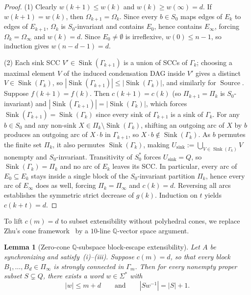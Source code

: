 \documentclass[11pt,a4paper]{article}
\newtheorem{lemma}[theorem]{Lemma}
\theoremstyle{definition}
\theoremstyle{remark}
\newcommand{\Sink}{\operatorname{Sink}}
\newcommand{\Source}{\operatorname{Source}}
\begin{document}
\begin{proof}
(1) Clearly $w(k + 1) \le w(k)$ and $w(k) \ge w(\infty) = d$. If $w(k + 1) = w(k)$, then $\Omega_{k+1} = \Omega_k$. Since every $b \in S_0$ maps edges of $E_k$ to edges of $E_{k+1}$, $\Omega_k$ is $S_0$-invariant and contains $E_0$, hence contains $E_\infty$, forcing $\Omega_k = \Omega_\infty$ and $w(k) = d$. Since $E_0 \neq \emptyset$ is irreflexive, $w(0) \le n - 1$, so induction gives $w(n - d - 1) = d$.

(2) Each sink SCC $V' \in \Sink(\Gamma_{k+1})$ is a union of SCCs of $\Gamma_k$; choosing a maximal element $V$ of the induced condensation DAG inside $V'$ gives a distinct $V \in \Sink(\Gamma_k)$, so $|\Sink(\Gamma_{k+1})| \le |\Sink(\Gamma_k)|$, and similarly for $\Source$. Suppose $f(k + 1) = f(k)$. Then $c(k + 1) = c(k)$ (so $\Pi_{k+1} = \Pi_k$ is $S_0$-invariant) and $|\Sink(\Gamma_{k+1})| = |\Sink(\Gamma_k)|$, which forces $\Sink(\Gamma_{k+1}) = \Sink(\Gamma_k)$ since every sink of $\Gamma_{k+1}$ is a sink of $\Gamma_k$. For any $b \in S_0$ and any non-sink $X \in \Pi_k \setminus \Sink(\Gamma_k)$, shifting an outgoing arc of $X$ by $b$ produces an outgoing arc of $X \cdot b$ in $\Gamma_{k+1}$, so $X \cdot b \notin \Sink(\Gamma_k)$. As $b$ permutes the finite set $\Pi_k$, it also permutes $\Sink(\Gamma_k)$, making $U_{\mathrm{sink}} := \bigcup_{V \in \Sink(\Gamma_k)} V$ nonempty and $S_0$-invariant. Transitivity of $S_0^*$ forces $U_{\mathrm{sink}} = Q$, so $\Sink(\Gamma_k) = \Pi_k$ and no arc of $E_k$ leaves its SCC. In particular, every arc of $E_0 \subseteq E_k$ stays inside a single block of the $S_0$-invariant partition $\Pi_k$, hence every arc of $E_\infty$ does as well, forcing $\Pi_k = \Pi_\infty$ and $c(k) = d$. Reversing all arcs establishes the symmetric strict decrease of $g(k)$. Induction on $t$ yields $c(k + t) = d$.
\end{proof}

To lift $c(m) = d$ to subset extensibility without polyhedral cones, we replace Zhu's cone framework~\cite{Zhu2024} by a $10$-line $\mathbb{Q}$-vector space argument.

\begin{lemma}[Zero-cone $\mathbb{Q}$-subspace block-escape extensibility]\label{lem:block-escape}
Let $A$ be synchronizing and satisfy~\textup{(i)--(iii)}. Suppose $c(m) = d$, so that every block $B_1, \dots, B_d \in \Pi_\infty$ is strongly connected in $\Gamma_m$. Then for every nonempty proper subset $S \subsetneq Q$, there exists a word $w \in \Sigma^*$ with
\[
  |w| \le m + d \qquad\text{and}\qquad |S w^{-1}| = |S| + 1.
\]
\end{lemma}
\end{document}
